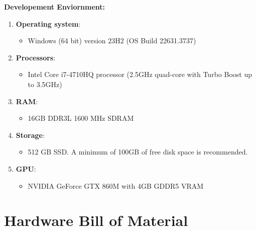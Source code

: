 \textbf{Developement Enviornment:}
\begin{enumerate}
	\item \textbf{Operating system}:
	\begin{itemize}
		\item Windows (64 bit) version 23H2 (OS Build 22631.3737)
	\end{itemize}
	
	\item \textbf{Processors}:
	\begin{itemize}
		\item Intel Core i7-4710HQ processor (2.5GHz quad-core with Turbo Boost up
		to 3.5GHz)
	\end{itemize}
	
	\item \textbf{RAM}:
	\begin{itemize}
		\item 16GB DDR3L 1600 MHz SDRAM
	\end{itemize}
	
	\item \textbf{Storage}:
	\begin{itemize}
		\item 512 GB SSD. A minimum of 100GB of free disk space is recommended.
	\end{itemize}
	
	\item \textbf{GPU}:
	\begin{itemize}
		\item NVIDIA GeForce GTX 860M with 4GB GDDR5 VRAM
	\end{itemize}
\end{enumerate}

\section{Hardware Bill of Material}

